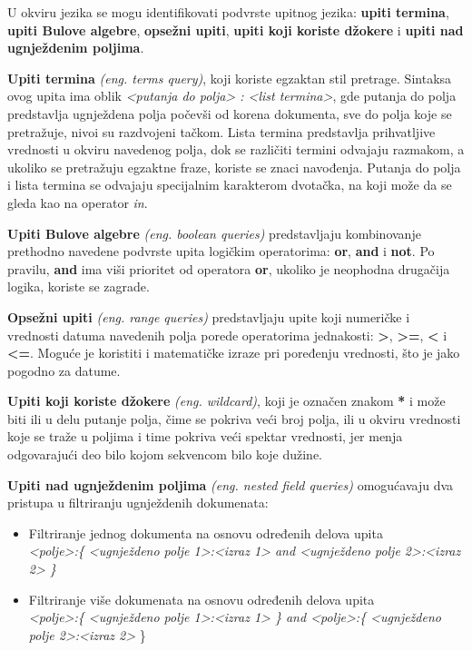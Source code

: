 \par
U okviru jezika se mogu identifikovati podvrste upitnog jezika: \textbf{upiti termina}, \textbf{upiti Bulove algebre}, \textbf{opsežni upiti}, \textbf{upiti koji koriste džokere} i \textbf{upiti nad ugnježdenim poljima}.

\par
\textbf{Upiti termina} \textit{(eng. terms query)}, koji koriste egzaktan stil pretrage. Sintaksa ovog upita ima oblik \textit{<putanja do polja> : <list termina>}, gde putanja do polja predstavlja ugnježdena polja počevši od korena dokumenta, sve do polja koje se pretražuje, nivoi su razdvojeni tačkom. Lista termina predstavlja prihvatljive vrednosti u okviru navedenog polja, dok se različiti termini odvajaju razmakom, a ukoliko se pretražuju egzaktne fraze, koriste se znaci navođenja. Putanja do polja i lista termina se odvajaju specijalnim karakterom dvotačka, na koji može da se gleda kao na operator \textit{in}.

\par
\textbf{Upiti Bulove algebre} \textit{(eng. boolean queries)} predstavljaju kombinovanje prethodno navedene podvrste upita logičkim operatorima: \textbf{or}, \textbf{and} i \textbf{not}. Po pravilu, \textbf{and} ima viši prioritet od operatora \textbf{or}, ukoliko je neophodna drugačija logika, koriste se zagrade.

\par
\textbf{Opsežni upiti} \textit{(eng. range queries)} predstavljaju upite koji numeričke i vrednosti datuma navedenih polja porede operatorima jednakosti: \textbf{>}, \textbf{>=}, \textbf{<} i \textbf{<=}. Moguće je koristiti i matematičke izraze pri poređenju vrednosti, što je jako pogodno za datume.

\par
\textbf{Upiti koji koriste džokere} \textit{(eng. wildcard)}, koji je označen znakom \textbf{*} i može biti ili u delu putanje polja, čime se pokriva veći broj polja, ili u okviru vrednosti koje se traže u poljima i time pokriva veći spektar vrednosti, jer menja odgovarajući deo bilo kojom sekvencom bilo koje dužine.

\par
\textbf{Upiti nad ugnježdenim poljima} \textit{(eng. nested field queries)} omogućavaju dva pristupa u filtriranju ugnježdenih dokumenata:
\begin{itemize}
    \item Filtriranje jednog dokumenta na osnovu određenih delova upita\\
\textit{<polje>:\{ <ugnježdeno polje 1>:<izraz 1> and <ugnježdeno polje 2>:<izraz 2> \}}
    \item Filtriranje više dokumenata na osnovu određenih delova upita \\
\textit{<polje>:\{ <ugnježdeno polje 1>:<izraz 1> \} and <polje>:\{ <ugnježdeno polje 2>:<izraz 2> }\}
\end{itemize}